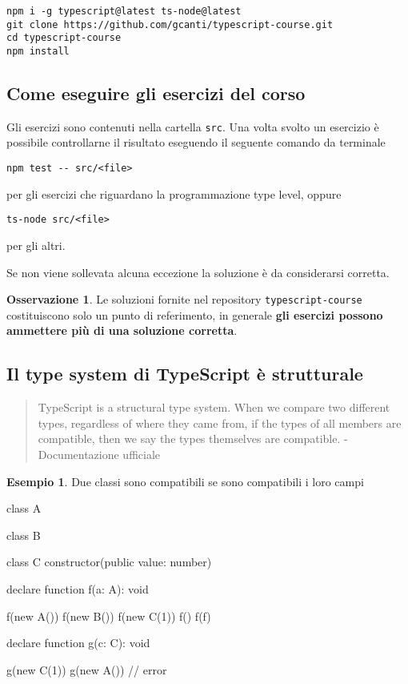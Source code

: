 \documentclass[12pt]{article}
\theoremstyle{definition}
\newtheorem{example}{Esempio}[subsection]
\newtheorem{observation}{Osservazione}[subsection]
\newenvironment{code}
  {\vspace{0.5cm} \VerbatimEnvironment\begin{typescriptcode}}
  {\end{typescriptcode} \vspace{0.2cm}}
\begin{document}
\begin{verbatim}
npm i -g typescript@latest ts-node@latest
git clone https://github.com/gcanti/typescript-course.git
cd typescript-course
npm install
\end{verbatim}

\subsection{Come eseguire gli esercizi del corso}

Gli esercizi sono contenuti nella cartella \texttt{src}. Una volta svolto un esercizio è possibile controllarne
il risultato eseguendo il seguente comando da terminale

\begin{verbatim}
npm test -- src/<file>
\end{verbatim}

per gli esercizi che riguardano la programmazione type level, oppure

\begin{verbatim}
ts-node src/<file>
\end{verbatim}

per gli altri.

Se non viene sollevata alcuna eccezione la soluzione è da considerarsi corretta.

\begin{observation}
Le soluzioni fornite nel repository \texttt{typescript-course} costituiscono solo un punto di referimento, in generale \textbf{gli esercizi possono ammettere più di una soluzione corretta}.
\end{observation}

\subsection{Il type system di TypeScript è strutturale}

\begin{quote}
TypeScript is a structural type system. When we compare two different types, regardless of where they came from,
if the types of all members are compatible, then we say the types themselves are compatible. - Documentazione ufficiale
\end{quote}

\begin{example}
Due classi sono compatibili se sono compatibili i loro campi

\begin{code}
class A {}

class B {}

class C {
  constructor(public value: number) {}
}

declare function f(a: A): void

f(new A())
f(new B())
f(new C(1))
f({})
f(f)

declare function g(c: C): void

g(new C(1))
g(new A()) // error
\end{code}
\end{example}
\end{document}
